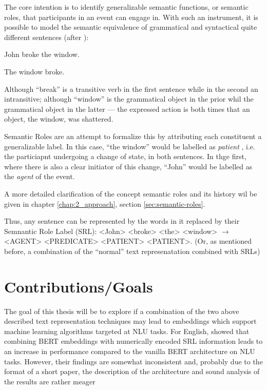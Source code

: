 The core intention is to identify generalizable semantic functions, or semantic roles,
that participants in an event can engage in. With such an instrument, it is possible to
model the semantic equivalence of grammatical and syntactical quite different sentences
(after \cite{palmer2010semantic}):

\begin{examples}
  \item John broke the window.
  \item The window broke.
\end{examples}

Although ``break'' is a transitive verb in the first sentence while in the second
an intransitive; although ``window'' is the grammatical object in the prior whil
the grammatical object in the latter --- the expressed action is both times that
an object, the window, was shattered.

Semantic Roles are an attempt to formalize this by attributing each constituent
a generalizable label. In this case, ``the window'' would be labelled as \emph{patient}
, i.e. the particiapnt undergoing a change of state, in both sentences.
In thge first, where there is also a clear initiator of this change, ``John''
would be labelled as the \emph{agent} of the event.

A more detailed clarification of the concept semantic roles and its history wil be
given in chapter \ref{chap:2_approach}, section \ref{sec:semantic-roles}.

Thus, any sentence can be represented by the words in it replaced by their Semnantic Role Label
(SRL): <John> <broke> <the> <window> $\rightarrow$ <AGENT> <PREDICATE> <PATIENT> <PATIENT>.
(Or, as mentioned before, a combination of the ``normal'' text represenatation combined with SRLs)




\section{Contributions/Goals}

The goal of this thesis will be to explore if a combination of the two above described text
representation techniques may lead to embeddings which support machine learning algorithms
targeted at NLU tasks. For English, \cite{zhang2019semantics} showed that combining BERT
embeddings with numerically encoded SRL information leads to an increase in performance
compared to the vanilla BERT architecture on NLU tasks. However, their findings are somewhat
inconsistent and, probably due to the format of a short paper, the description of the
architecture and sound analysis of the results are {\color{red} rather meager}

